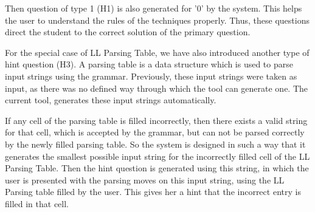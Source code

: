 Then question of type 1 (H1) is also generated for '0' by the system. This helps the user to understand the rules of the techniques properly. Thus, these questions direct the student to the correct solution of the primary question.

For the special case of LL Parsing Table, we have also introduced another type of hint question (H3). A parsing table is a data structure which is used to parse input strings using the grammar. Previously, these input strings were taken as input, as there was no defined way through which the tool can generate one. The current tool, generates these input strings automatically.

If any cell of the parsing table is filled incorrectly, then there exists a valid string for that cell, which is accepted by the grammar, but can not be parsed correctly by the newly filled parsing table. So the system is designed in such a way that it generates the smallest possible input string for the incorrectly filled cell of the LL Parsing Table. Then the hint question is generated using this string, in which the user is presented with the parsing moves on this input string, using the LL Parsing table filled by the user. This gives her a hint that the incorrect entry is filled in that cell.

